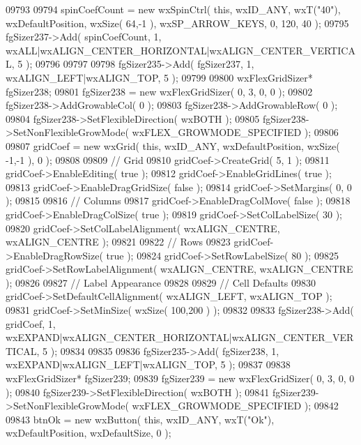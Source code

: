 \begin{DoxyCode}
09793     
09794     spinCoefCount = \textcolor{keyword}{new} wxSpinCtrl( \textcolor{keyword}{this}, wxID\_ANY, wxT(\textcolor{stringliteral}{"40"}), wxDefaultPosition, wxSize( 64,-1 ), 
      wxSP\_ARROW\_KEYS, 0, 120, 40 );
09795     fgSizer237->Add( spinCoefCount, 1, wxALL|wxALIGN\_CENTER\_HORIZONTAL|wxALIGN\_CENTER\_VERTICAL, 5 );
09796     
09797     
09798     fgSizer235->Add( fgSizer237, 1, wxALIGN\_LEFT|wxALIGN\_TOP, 5 );
09799     
09800     wxFlexGridSizer* fgSizer238;
09801     fgSizer238 = \textcolor{keyword}{new} wxFlexGridSizer( 0, 3, 0, 0 );
09802     fgSizer238->AddGrowableCol( 0 );
09803     fgSizer238->AddGrowableRow( 0 );
09804     fgSizer238->SetFlexibleDirection( wxBOTH );
09805     fgSizer238->SetNonFlexibleGrowMode( wxFLEX\_GROWMODE\_SPECIFIED );
09806     
09807     gridCoef = \textcolor{keyword}{new} wxGrid( \textcolor{keyword}{this}, wxID\_ANY, wxDefaultPosition, wxSize( -1,-1 ), 0 );
09808     
09809     \textcolor{comment}{// Grid}
09810     gridCoef->CreateGrid( 5, 1 );
09811     gridCoef->EnableEditing( \textcolor{keyword}{true} );
09812     gridCoef->EnableGridLines( \textcolor{keyword}{true} );
09813     gridCoef->EnableDragGridSize( \textcolor{keyword}{false} );
09814     gridCoef->SetMargins( 0, 0 );
09815     
09816     \textcolor{comment}{// Columns}
09817     gridCoef->EnableDragColMove( \textcolor{keyword}{false} );
09818     gridCoef->EnableDragColSize( \textcolor{keyword}{true} );
09819     gridCoef->SetColLabelSize( 30 );
09820     gridCoef->SetColLabelAlignment( wxALIGN\_CENTRE, wxALIGN\_CENTRE );
09821     
09822     \textcolor{comment}{// Rows}
09823     gridCoef->EnableDragRowSize( \textcolor{keyword}{true} );
09824     gridCoef->SetRowLabelSize( 80 );
09825     gridCoef->SetRowLabelAlignment( wxALIGN\_CENTRE, wxALIGN\_CENTRE );
09826     
09827     \textcolor{comment}{// Label Appearance}
09828     
09829     \textcolor{comment}{// Cell Defaults}
09830     gridCoef->SetDefaultCellAlignment( wxALIGN\_LEFT, wxALIGN\_TOP );
09831     gridCoef->SetMinSize( wxSize( 100,200 ) );
09832     
09833     fgSizer238->Add( gridCoef, 1, wxEXPAND|wxALIGN\_CENTER\_HORIZONTAL|wxALIGN\_CENTER\_VERTICAL, 5 );
09834     
09835     
09836     fgSizer235->Add( fgSizer238, 1, wxEXPAND|wxALIGN\_LEFT|wxALIGN\_TOP, 5 );
09837     
09838     wxFlexGridSizer* fgSizer239;
09839     fgSizer239 = \textcolor{keyword}{new} wxFlexGridSizer( 0, 3, 0, 0 );
09840     fgSizer239->SetFlexibleDirection( wxBOTH );
09841     fgSizer239->SetNonFlexibleGrowMode( wxFLEX\_GROWMODE\_SPECIFIED );
09842     
09843     btnOk = \textcolor{keyword}{new} wxButton( \textcolor{keyword}{this}, wxID\_ANY, wxT(\textcolor{stringliteral}{"Ok"}), wxDefaultPosition, wxDefaultSize, 0 );

\end{DoxyCode}
